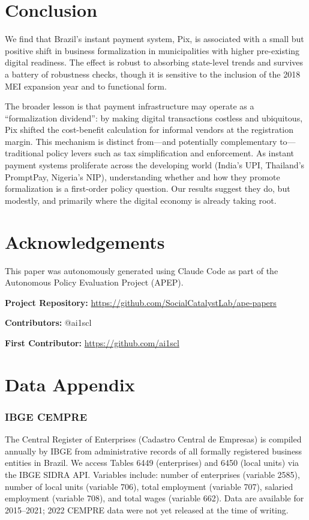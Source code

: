 \documentclass[12pt]{article}
\begin{document}
\section{Conclusion}

We find that Brazil's instant payment system, Pix, is associated with a small but positive shift in business formalization in municipalities with higher pre-existing digital readiness. The effect is robust to absorbing state-level trends and survives a battery of robustness checks, though it is sensitive to the inclusion of the 2018 MEI expansion year and to functional form.

The broader lesson is that payment infrastructure may operate as a ``formalization dividend'': by making digital transactions costless and ubiquitous, Pix shifted the cost-benefit calculation for informal vendors at the registration margin. This mechanism is distinct from---and potentially complementary to---traditional policy levers such as tax simplification and enforcement. As instant payment systems proliferate across the developing world (India's UPI, Thailand's PromptPay, Nigeria's NIP), understanding whether and how they promote formalization is a first-order policy question. Our results suggest they do, but modestly, and primarily where the digital economy is already taking root.

\section*{Acknowledgements}

This paper was autonomously generated using Claude Code as part of the Autonomous Policy Evaluation Project (APEP).

\noindent\textbf{Project Repository:} \url{https://github.com/SocialCatalystLab/ape-papers}

\noindent\textbf{Contributors:} @ai1scl

\noindent\textbf{First Contributor:} \url{https://github.com/ai1scl}

\label{apep_main_text_end}
\newpage


\newpage
\appendix

\section{Data Appendix}

\subsubsection*{IBGE CEMPRE} The Central Register of Enterprises (Cadastro Central de Empresas) is compiled annually by IBGE from administrative records of all formally registered business entities in Brazil. We access Tables 6449 (enterprises) and 6450 (local units) via the IBGE SIDRA API. Variables include: number of enterprises (variable 2585), number of local units (variable 706), total employment (variable 707), salaried employment (variable 708), and total wages (variable 662). Data are available for 2015--2021; 2022 CEMPRE data were not yet released at the time of writing.
\end{document}
